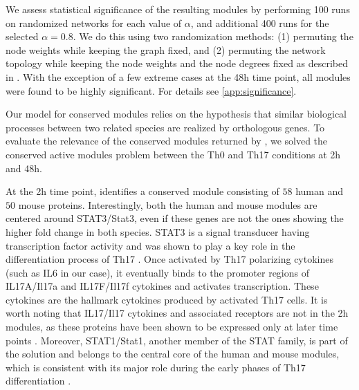 We assess statistical significance of the resulting modules by performing 100 runs on randomized networks for each value of $\alpha$, and additional 400 runs for the selected $\alpha=0.8$.
We do this using two randomization methods: (1) permuting the node weights while keeping the graph fixed, and (2) permuting the network topology while keeping the node weights and the node degrees fixed as described in \parencite{mihail2003markov}.
With the exception of a few extreme cases at the \unit{48}{h} time point, all modules were found to be highly significant.
For details see \cref{app:significance}.

Our model for conserved modules relies on the hypothesis that similar biological processes between two related species are realized by orthologous genes.
To evaluate the relevance of the conserved modules returned by \xheinz, we solved the conserved active modules problem between the Th0 and Th17 conditions at \unit{2}{h} and \unit{48}{h}.

At the \unit{2}{h} time point, \xheinz{} identifies a conserved module consisting of $58$ human and $50$ mouse proteins.
Interestingly, both the human and mouse modules are centered around STAT3/Stat3, even if these genes are not the ones showing the higher fold change in both species.
STAT3 is a signal transducer having transcription factor activity and was shown to play a key role in the differentiation process of Th17 \parencite{harris2007cutting}.
Once activated by Th17 polarizing cytokines (such as IL6 in our case), it eventually binds to the promoter regions of IL17A/Il17a and IL17F/Il17f cytokines and activates transcription.
These cytokines are the hallmark cytokines produced by activated Th17 cells.
It is worth noting that IL17/Il17 cytokines and associated receptors are not in the \unit{2}{h} modules, as these proteins have been shown to be expressed only at later time points \parencite{tuomela2012identification}.
Moreover, STAT1/Stat1, another member of the STAT family, is part of the solution and belongs to the central core of the human and mouse modules, which is consistent with its major role during the early phases of Th17 differentiation \parencite{yosef2013dynamic}.


